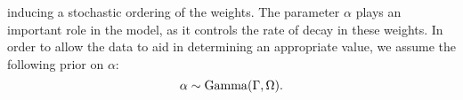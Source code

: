 inducing a stochastic ordering of the weights. The parameter $\alpha$ plays an important role in the model, as it controls the rate of decay in these weights. In order to allow the data to aid in determining an appropriate value, we assume the following prior on $\alpha$:
\begin{equation}
\alpha \sim \operatorname{Gamma}(\Gamma, \Omega).
\end{equation}


% 
% 
% 
% 
% 
% 
% 
